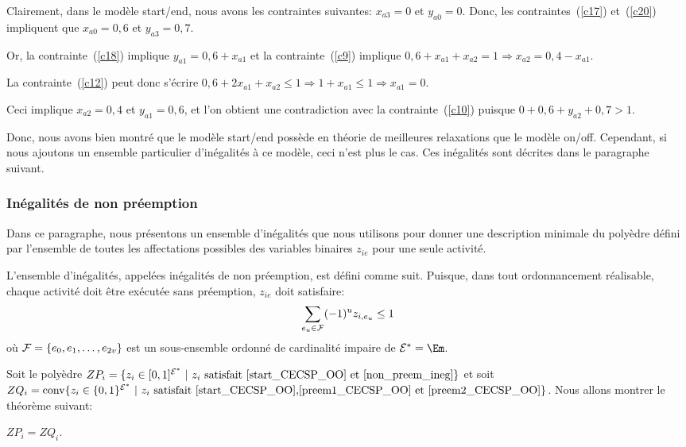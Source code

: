 Clairement, dans le modèle start/end, nous avons les contraintes
suivantes: $x_{a3}=0$ et $y_{a0}=0$. Donc, les contraintes~(\ref{c17})
et~(\ref{c20}) impliquent que $x_{a0}=0,6$ et $y_{a3}=0,7$. 

Or, la contrainte~(\ref{c18}) implique $y_{a1}=0,6+x_{a1}$
et la contrainte~(\ref{c9}) implique $0,6+x_{a1}+x_{a2}=1 \Rightarrow
x_{a2}=0,4-x_{a1}$. 

La contrainte~(\ref{c12}) peut donc s'écrire
$0,6+2x_{a1}+x_{a2}\le 1 \Rightarrow 1+x_{a1}\le 1 \Rightarrow
x_{a1}=0$. 

Ceci implique $x_{a2}=0,4$ et $y_{a1}=0,6$, et l'on obtient
une contradiction avec la contrainte~(\ref{c10}) puisque $0+0,6+y_{a2}+0,7>1$.

Donc, nous avons bien montré que le modèle start/end possède en
théorie de meilleures relaxations que le modèle on/off. Cependant, si
nous ajoutons un ensemble particulier d'inégalités à ce modèle, ceci
n'est plus le cas. Ces inégalités sont décrites dans le paragraphe
suivant.


\subsubsection{Inégalités de non préemption}

Dans ce paragraphe, nous présentons un ensemble d'inégalités que nous
utilisons pour donner une description minimale du polyèdre défini par
l'ensemble de toutes les affectations possibles des variables binaires
$z_{ie}$ pour une seule activité. 

L'ensemble d'inégalités, appelées inégalités de non préemption, est
défini comme suit. Puisque, dans tout ordonnancement réalisable,
chaque activité doit être exécutée sans préemption, $z_{ie}$ doit
satisfaire:
\begin{equation}
  \sum_{e_u \in {\cal F}} (-1)^{u} z_{i,e_u} \le 1
\label{non_preem_ineg}
\end{equation}
où ${\cal F}=\{e_0,e_1,\dots,e_{2v}\}$ est un sous-ensemble ordonné de
cardinalité impaire de $\E^*=\Em$.  

Soit le polyèdre $ZP_i=\{z_i \in [0,1]^{{\cal E}^*}\ | \ z_i\text{ satisfait
\eqref{start_CECSP_OO} et \eqref{non_preem_ineg}}\}$ et soit
$ZQ_i=\mathrm{conv}\{z_i \in \{0,1\}^{{\cal E}^*}\ | \ z_i\text{ satisfait
\eqref{start_CECSP_OO},\eqref{preem1_CECSP_OO} et
\eqref{preem2_CECSP_OO}}\}$. Nous allons montrer le théorème suivant: 

\begin{theo}
$ZP_i=ZQ_i$.
\end{theo}


